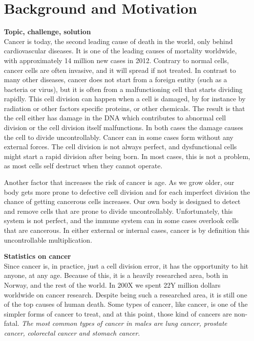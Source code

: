 \section{Background and Motivation}

\textbf{Topic, challenge, solution}\\
Cancer is today, the second leading cause of death in the world, only behind cardiovascular diseases.  %
It is one of the leading causes of mortality worldwide, with approximately 14 million new cases in 2012.\cite{WHOCANCER}
Contrary to normal cells, cancer cells are often invasive, and it will spread if not treated. 
In contrast to many other diseases, cancer does not start from a foreign entity (such as a bacteria or virus), but it is often from a malfunctioning cell that starts dividing rapidly. 
This cell division can happen when a cell is damaged, by for instance by radiation or other factors specific proteins, or other chemicals. The result is that the cell either has damage in the DNA which contributes to abnormal cell division or the cell division itself malfunctions. In both cases the damage causes the cell to divide uncontrollably. 
Cancer can in some cases form without any external forces. The cell division is not always perfect, and dysfunctional cells might start a rapid division after being born. In most cases, this is not a problem, as most cells self destruct when they cannot operate. 

Another factor that increases the risk of cancer is age. As we grow older, our body gets more prone to defective cell division and for each imperfect division the chance of getting cancerous cells increases.  
Our own body is designed to detect and remove cells that are prone to divide uncontrollably. Unfortunately, this system is not perfect, and the immune system can in some cases overlook cells that are cancerous.
In either external or internal cases, cancer is by definition this uncontrollable multiplication.




\textbf{Statistics on cancer}\\
Since cancer is, in practice, just a cell division error, it has the opportunity to hit anyone, at any age. Because of this, it is a heavily researched area, both in Norway, and the rest of the world.
In 200X we spent 22Y million dollars worldwide on cancer research. 
Despite being such a researched area, it is still one of the top causes of human death. 
Some types of cancer, like \todo{} cancer, is one of the simpler forms of cancer to treat, and at this point, those kind of cancers are non-fatal. 
\textit{The most common types of cancer in males are lung cancer, prostate cancer, colorectal cancer and stomach cancer.\cite{stewart2014world}}
    
